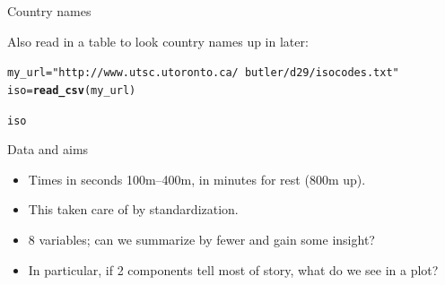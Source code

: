 \documentclass[unknownkeysallowed]{beamer}\usepackage[]{graphicx}\usepackage[]{color}
\makeatletter
\newcommand{\hlstr}[1]{\textcolor[rgb]{0.192,0.494,0.8}{#1}}%
\newcommand{\hlstd}[1]{\textcolor[rgb]{0.345,0.345,0.345}{#1}}%
\newcommand{\hlkwb}[1]{\textcolor[rgb]{0.69,0.353,0.396}{#1}}%
\newcommand{\hlkwd}[1]{\textcolor[rgb]{0.737,0.353,0.396}{\textbf{#1}}}%
\newenvironment{kframe}{%
 \def\at@end@of@kframe{}%
 \ifinner\ifhmode%
  \def\at@end@of@kframe{\end{minipage}}%
  \begin{minipage}{\columnwidth}%
 \fi\fi%
 \def\FrameCommand##1{\hskip\@totalleftmargin \hskip-\fboxsep
 \colorbox{shadecolor}{##1}\hskip-\fboxsep
     \hskip-\linewidth \hskip-\@totalleftmargin \hskip\columnwidth}%
 \MakeFramed {\advance\hsize-\width
   \@totalleftmargin\z@ \linewidth\hsize
   \@setminipage}}%
 {\par\unskip\endMakeFramed%
 \at@end@of@kframe}
\newenvironment{knitrout}{}{} %
\makeatother
\begin{document}
\begin{frame}[fragile]{Country names}
  
Also read in a table to look country names up in later:

\begin{knitrout}\small
{}\color{fgcolor}\begin{kframe}
\begin{alltt}
\hlstd{my_url}\hlkwb{=}\hlstr{"http://www.utsc.utoronto.ca/~butler/d29/isocodes.txt"}
\hlstd{iso}\hlkwb{=}\hlkwd{read_csv}\hlstd{(my_url)}
\end{alltt}


{\ttfamily\noindent\bfseries{}}\begin{alltt}
\hlstd{iso}
\end{alltt}


{\ttfamily\noindent\bfseries\color{errorcolor}{\#\# Error in eval(expr, envir, enclos): object 'iso' not found}}\end{kframe}
\end{knitrout}
  
\end{frame}

\begin{frame}[fragile]{Data and aims}

  \begin{itemize}
  \item 
Times in seconds 100m--400m, in minutes for rest (800m up).
\item This taken care of by standardization.
\item 8 variables; can we summarize by fewer and gain some insight?
\item In particular, if 2 components tell most of story, what do we see in a plot?

  \end{itemize}

  
\end{frame}
\end{document}
